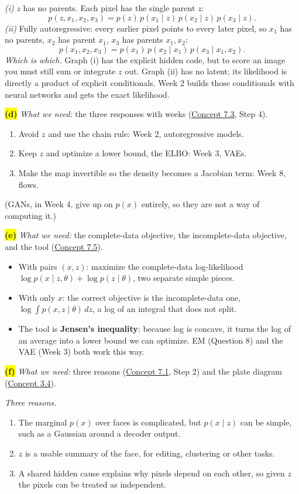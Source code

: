 \documentclass[12pt,a4paper]{article}
\begin{document}
\emph{(i)} $z$ has no parents. Each pixel has the single parent $z$:
\[
p(z,x_1,x_2,x_3)=p(z)\,p(x_1\mid z)\,p(x_2\mid z)\,p(x_3\mid z).
\]
\emph{(ii)} Fully autoregressive: every earlier pixel points to every later pixel, so $x_1$ has no parents, $x_2$ has parent $x_1$, $x_3$ has parents $x_1,x_2$:
\[
p(x_1,x_2,x_3)=p(x_1)\,p(x_2\mid x_1)\,p(x_3\mid x_1,x_2).
\]
\emph{Which is which.} Graph (i) has the explicit hidden code, but to score an image you must still sum or integrate $z$ out. Graph (ii) has no latent; its likelihood is directly a product of explicit conditionals. Week 2 builds those conditionals with neural networks and gets the exact likelihood.

\colorbox{yellow}{\textbf{(d)}} \emph{What we need:} the three responses with weeks (\hyperref[c7-3]{Concept 7.3}, Step 4).
\begin{enumerate}[nosep]
  \item Avoid $z$ and use the chain rule: Week 2, autoregressive models.
  \item Keep $z$ and optimize a lower bound, the ELBO: Week 3, VAEs.
  \item Make the map invertible so the density becomes a Jacobian term: Week 8, flows.
\end{enumerate}
(GANs, in Week 4, give up on $p(x)$ entirely, so they are not a way of computing it.)

\colorbox{yellow}{\textbf{(e)}} \emph{What we need:} the complete-data objective, the incomplete-data objective, and the tool (\hyperref[c7-5]{Concept 7.5}).
\begin{itemize}[nosep]
  \item With pairs $(x,z)$: maximize the complete-data log-likelihood $\log p(x\mid z,\theta)+\log p(z\mid\theta)$, two separate simple pieces.
  \item With only $x$: the correct objective is the incomplete-data one, $\log\int p(x,z\mid\theta)\,dz$, a log of an integral that does not split.
  \item The tool is \textbf{Jensen's inequality}: because log is concave, it turns the log of an average into a lower bound we can optimize. EM (Question 8) and the VAE (Week 3) both work this way.
\end{itemize}

\colorbox{yellow}{\textbf{(f)}} \emph{What we need:} three reasons (\hyperref[c7-1]{Concept 7.1}, Step 2) and the plate diagram (\hyperref[c3-4]{Concept 3.4}).

\emph{Three reasons.}
\begin{enumerate}[nosep]
  \item The marginal $p(x)$ over faces is complicated, but $p(x\mid z)$ can be simple, such as a Gaussian around a decoder output.
  \item $z$ is a usable summary of the face, for editing, clustering or other tasks.
  \item A shared hidden cause explains why pixels depend on each other, so given $z$ the pixels can be treated as independent.
\end{enumerate}
\end{document}
